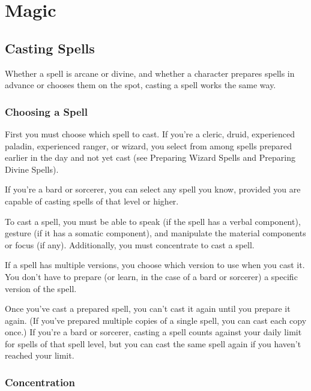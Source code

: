 \chapter{Magic}
\section{Casting Spells}

\label{f0}				
Whether a spell is arcane or divine, and whether a character prepares spells in advance or chooses them on the spot, casting a spell works the same way.
				
\subsection{Choosing a Spell}

				
First you must choose which spell to cast. If you're a cleric, druid, experienced paladin, experienced ranger, or wizard, you select from among spells prepared earlier in the day and not yet cast (see Preparing Wizard Spells and Preparing Divine Spells).
				
If you're a bard or sorcerer, you can select any spell you know, provided you are capable of casting spells of that level or higher.
				
To cast a spell, you must be able to speak (if the spell has a verbal component), gesture (if it has a somatic component), and manipulate the material components or focus (if any). Additionally, you must concentrate to cast a spell. 
				
If a spell has multiple versions, you choose which version to use when you cast it. You don't have to prepare (or learn, in the case of a bard or sorcerer) a specific version of the spell.
				
Once you've cast a prepared spell, you can't cast it again until you prepare it again. (If you've prepared multiple copies of a single spell, you can cast each copy once.) If you're a bard or sorcerer, casting a spell counts against your daily limit for spells of that spell level, but you can cast the same spell again if you haven't reached your limit.
				
\subsection{Concentration}


